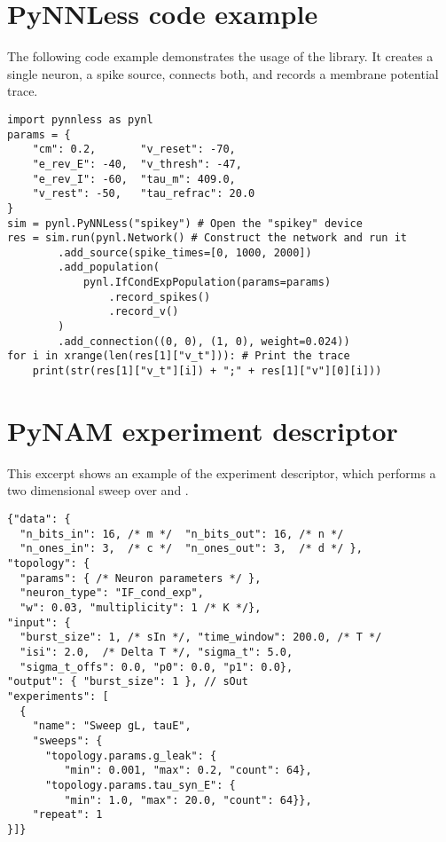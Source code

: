 \section{PyNNLess code example}
\label{app:pynnless_example}

The following code example demonstrates the usage of the \PyNNLess library. It creates a single \LIF neuron, a spike source, connects both, and records a membrane potential trace.
\begin{verbatim}
import pynnless as pynl
params = {
    "cm": 0.2,       "v_reset": -70,
    "e_rev_E": -40,  "v_thresh": -47,
    "e_rev_I": -60,  "tau_m": 409.0,
    "v_rest": -50,   "tau_refrac": 20.0
}
sim = pynl.PyNNLess("spikey") # Open the "spikey" device
res = sim.run(pynl.Network() # Construct the network and run it
        .add_source(spike_times=[0, 1000, 2000])
        .add_population(
            pynl.IfCondExpPopulation(params=params)
                .record_spikes()
                .record_v()
        )
        .add_connection((0, 0), (1, 0), weight=0.024))
for i in xrange(len(res[1]["v_t"])): # Print the trace
    print(str(res[1]["v_t"][i]) + ";" + res[1]["v"][0][i]))
\end{verbatim}

\section{PyNAM experiment descriptor}
\label{app:pynam_experiment_json}

This excerpt shows an example of the \PyNAM experiment descriptor, which performs a two dimensional sweep over \Gl and \TauE.
{\begingroup
\small
\begin{verbatim}
{"data": {
  "n_bits_in": 16, /* m */  "n_bits_out": 16, /* n */
  "n_ones_in": 3,  /* c */  "n_ones_out": 3,  /* d */ },
"topology": {
  "params": { /* Neuron parameters */ },
  "neuron_type": "IF_cond_exp",
  "w": 0.03, "multiplicity": 1 /* K */},
"input": {
  "burst_size": 1, /* sIn */, "time_window": 200.0, /* T */
  "isi": 2.0,  /* Delta T */, "sigma_t": 5.0,
  "sigma_t_offs": 0.0, "p0": 0.0, "p1": 0.0},
"output": { "burst_size": 1 }, // sOut
"experiments": [
  {
    "name": "Sweep gL, tauE",
    "sweeps": {
      "topology.params.g_leak": {
         "min": 0.001, "max": 0.2, "count": 64},
      "topology.params.tau_syn_E": {
         "min": 1.0, "max": 20.0, "count": 64}},
    "repeat": 1
}]}
\end{verbatim}
\endgroup}